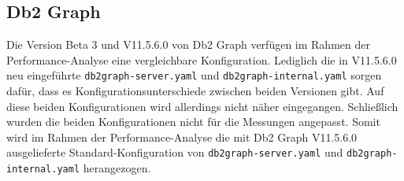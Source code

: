 \subsection{Db2 Graph}
Die Version Beta 3 und V11.5.6.0 von Db2 Graph verfügen im Rahmen der Performance-Analyse eine vergleichbare Konfiguration. Lediglich die in V11.5.6.0 neu eingeführte \texttt{db2graph-server.yaml} und \texttt{db2graph-internal.yaml} sorgen dafür, dass es Konfigurationsunterschiede zwischen beiden Versionen gibt. Auf diese beiden Konfigurationen wird allerdings nicht näher eingegangen. Schließlich wurden die beiden Konfigurationen nicht für die Messungen angepasst. Somit wird im Rahmen der Performance-Analyse die mit Db2 Graph V11.5.6.0 ausgelieferte Standard-Konfiguration von \texttt{db2graph-server.yaml} und \texttt{db2graph-internal.yaml} her\-angezogen.

